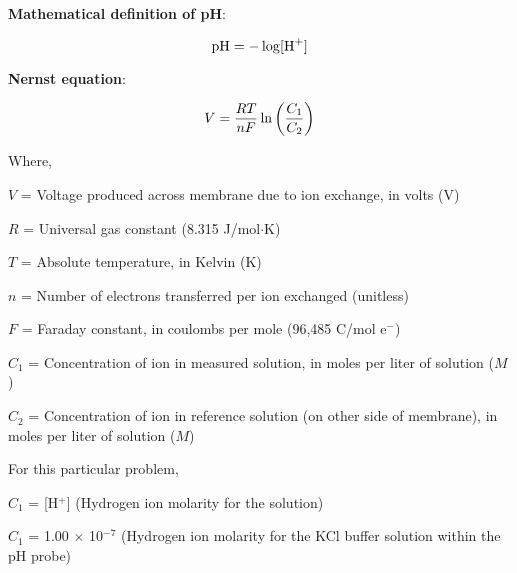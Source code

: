 





\noindent
{\bf Mathematical definition of pH}:

$$\hbox{pH} = - \log [\hbox{H}^{+}]$$

\vskip 10pt

\noindent
{\bf Nernst equation}:

$$V = {{R T} \over {nF}} \ln \left({C_1 \over C_2}\right)$$

\noindent
Where,

$V$ = Voltage produced across membrane due to ion exchange, in volts (V)

$R$ = Universal gas constant (8.315 J/mol$\cdot$K)

$T$ = Absolute temperature, in Kelvin (K)

$n$ = Number of electrons transferred per ion exchanged (unitless)

$F$ = Faraday constant, in coulombs per mole (96,485 C/mol e$^{-}$)

$C_1$ = Concentration of ion in measured solution, in moles per liter of solution ($M$)

$C_2$ = Concentration of ion in reference solution (on other side of membrane), in moles per liter of solution ($M$)

\vskip 20pt

\noindent
For this particular problem,

\vskip 10pt

$C_1$ = [H$^{+}$] (Hydrogen ion molarity for the solution)

$C_1$ = 1.00 $\times$ 10$^{-7}$ (Hydrogen ion molarity for the KCl buffer solution within the pH probe)





